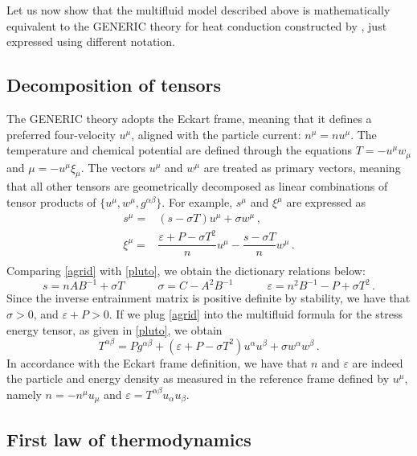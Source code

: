 \documentclass[a4paper, amsfonts, amssymb, amsmath, reprint, showkeys, nofootinbib, twoside, onecolumn, notitlepage]{revtex4-1}
\newcommand{\spc}{\quad \quad \quad}
\begin{document}
Let us now show that the multifluid model described above is mathematically equivalent to the GENERIC theory for heat conduction constructed by \citet{OttingerSoloHeat1998}, just expressed using different notation. 

\subsection{Decomposition of tensors}\label{geenr}

The GENERIC theory adopts the Eckart frame, meaning that it defines a preferred four-velocity $u^\mu$, aligned with the particle current: $n^\mu = n u^\mu$. The temperature and chemical potential are defined through the equations $T=-u^\mu w_\mu$ and $\mu = -u^\mu \xi_\mu$. The vectors $u^\mu$ and $w^\mu$ are treated as primary vectors, meaning that all other tensors are geometrically decomposed as linear combinations of tensor products of $\{u^\mu, w^\mu,g^{\alpha \beta} \}$. For example, $s^\mu$ and $\xi^\mu$ are expressed as
\begin{equation}\label{agrid}
\begin{split}
s^\mu ={}& (s{-}\sigma T)u^\mu +\sigma w^\mu \, ,\\
\xi^\mu ={}& \dfrac{\varepsilon{+}P{-}\sigma T^2}{n} u^\mu - \dfrac{s{-}\sigma T}{n} w^\mu \, . \\
\end{split}
\end{equation}
Comparing \eqref{agrid} with \eqref{pluto}, we obtain the dictionary relations below:
\begin{equation}
s=n AB^{-1}+\sigma T \spc \sigma=C-A^2 B^{-1} \spc \varepsilon=n^2 B^{-1}-P+\sigma T^2 \, .
\end{equation}
Since the inverse entrainment matrix is positive definite by stability, we have that $\sigma>0$, and $\varepsilon+P > 0$. If we plug \eqref{agrid} into the multifluid formula for the stress energy tensor, as given in \eqref{pluto}, we obtain
\begin{equation}\label{dementor}
T^{\alpha \beta}= Pg^{\alpha \beta}+(\varepsilon{+}P{-}\sigma T^2 )u^\alpha u^\beta+\sigma w^\alpha w^\beta \, .
\end{equation}
In accordance with the Eckart frame definition, we have that $n$ and $\varepsilon$ are indeed the particle and energy density as measured in the reference frame defined by $u^\mu$, namely $n=-n^\mu u_\mu$ and $\varepsilon=T^{\alpha \beta}u_\alpha u_\beta$.

\subsection{First law of thermodynamics}
\end{document}
